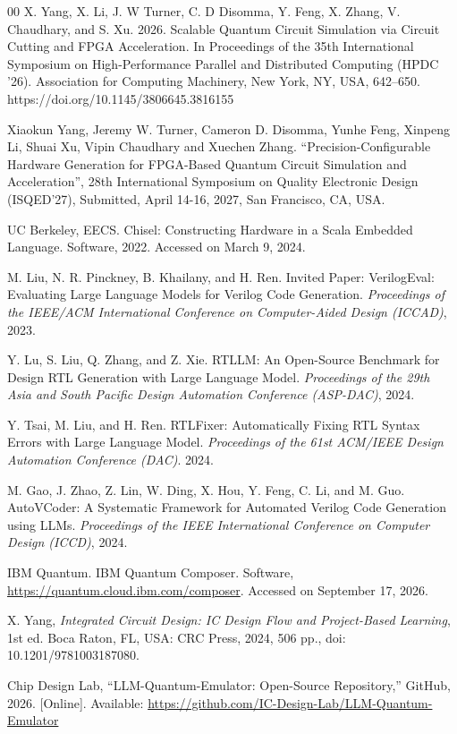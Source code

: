 \documentclass[conference]{IEEEtran}
\begin{document}
\begin{thebibliography}{00}
 X. Yang, X. Li, J. W Turner, C. D Disomma, Y. Feng, X. Zhang, V. Chaudhary, and S. Xu. 2026. Scalable Quantum Circuit Simulation via Circuit Cutting and FPGA Acceleration. In Proceedings of the 35th International Symposium on High-Performance Parallel and Distributed Computing (HPDC '26). Association for Computing Machinery, New York, NY, USA, 642–650. https://doi.org/10.1145/3806645.3816155

Xiaokun Yang, Jeremy W. Turner, Cameron D. Disomma, Yunhe Feng, Xinpeng Li, Shuai Xu, Vipin Chaudhary and Xuechen Zhang. “Precision-Configurable Hardware Generation for FPGA-Based Quantum Circuit Simulation and Acceleration”, 28th International Symposium on Quality Electronic Design (ISQED’27), Submitted, April 14-16, 2027, San Francisco, CA, USA.

 UC Berkeley, EECS. Chisel: Constructing Hardware in a Scala Embedded Language. Software, 2022. Accessed on March 9, 2024.

 M. Liu, N. R. Pinckney, B. Khailany, and H. Ren. Invited Paper: VerilogEval: Evaluating Large Language Models for Verilog Code Generation.  \textit{Proceedings of the IEEE/ACM International Conference
on Computer-Aided Design (ICCAD)}, 2023.

 Y. Lu, S. Liu, Q. Zhang, and Z. Xie. RTLLM: An Open-Source Benchmark for Design RTL Generation with Large Language Model. \textit{Proceedings of the 29th Asia and South Pacific Design Automation Conference (ASP-DAC)}, 2024.

 Y. Tsai, M. Liu, and H. Ren. RTLFixer: Automatically Fixing RTL Syntax Errors with Large Language Model. \textit{Proceedings of the 61st ACM/IEEE Design Automation Conference (DAC)}. 2024.

 M. Gao, J. Zhao, Z. Lin, W. Ding, X. Hou, Y. Feng, C. Li, and M. Guo. AutoVCoder: A Systematic Framework for Automated Verilog Code Generation using LLMs. \textit{Proceedings of the IEEE International Conference
on Computer Design (ICCD)}, 2024.

 IBM Quantum. IBM Quantum Composer. Software, \url{https://quantum.cloud.ibm.com/composer}. Accessed on September 17, 2026.


X. Yang, \textit{Integrated Circuit Design: IC Design Flow and Project-Based Learning}, 1st ed. Boca Raton, FL, USA: CRC Press, 2024, 506 pp., doi: 10.1201/9781003187080.

Chip Design Lab, ``LLM-Quantum-Emulator: Open-Source Repository,'' GitHub, 2026. [Online]. Available: \url{https://github.com/IC-Design-Lab/LLM-Quantum-Emulator}

\end{thebibliography}
\end{document}
